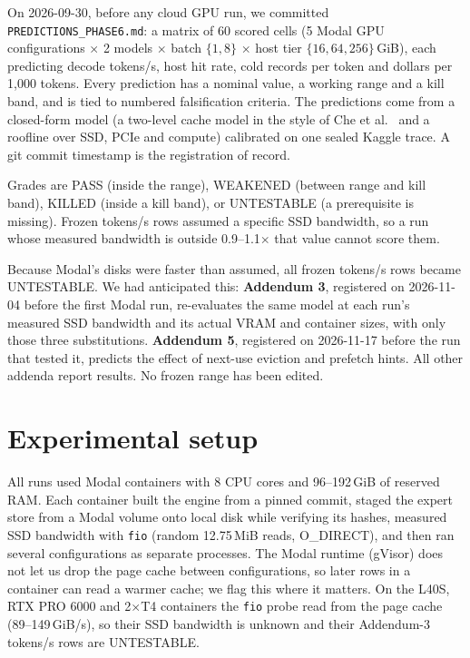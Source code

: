 \documentclass[11pt]{article}
\begin{document}
On 2026-09-30, before any cloud GPU run, we committed
\texttt{PREDICTIONS\_PHASE6.md}: a matrix of 60 scored cells (5 Modal GPU
configurations $\times$ 2 models $\times$ batch $\{1,8\}$ $\times$ host tier
$\{16, 64, 256\}$\,GiB), each predicting decode tokens/s, host hit rate, cold
records per token and dollars per 1,000 tokens. Every prediction has a nominal
value, a working range and a kill band, and is tied to numbered falsification
criteria. The predictions come from a closed-form model (a two-level cache
model in the style of Che et al.\ \citep{che2002hierarchical} and a roofline over
SSD, PCIe and compute) calibrated on one sealed Kaggle trace. A git commit
timestamp is the registration of record.

Grades are PASS (inside the range), WEAKENED (between range and kill band),
KILLED (inside a kill band), or UNTESTABLE (a prerequisite is missing). Frozen
tokens/s rows assumed a specific SSD bandwidth, so a run whose measured
bandwidth is outside 0.9--1.1$\times$ that value cannot score them.

Because Modal's disks were faster than assumed, all frozen tokens/s rows became
UNTESTABLE. We had anticipated this: \textbf{Addendum 3}, registered on
2026-11-04 before the first Modal run, re-evaluates the same model at each run's
measured SSD bandwidth and its actual VRAM and container sizes, with only those
three substitutions. \textbf{Addendum 5}, registered on 2026-11-17 before the
run that tested it, predicts the effect of next-use eviction and prefetch hints.
All other addenda report results. No frozen range has been edited.

\section{Experimental setup}

All runs used Modal containers with 8 CPU cores and 96--192\,GiB of reserved
RAM. Each container built the engine from a pinned commit, staged the expert
store from a Modal volume onto local disk while verifying its hashes, measured
SSD bandwidth with \texttt{fio} (random 12.75\,MiB reads, O\_DIRECT), and then ran
several configurations as separate processes. The Modal runtime (gVisor) does
not let us drop the page cache between configurations, so later rows in a
container can read a warmer cache; we flag this where it matters. On the L40S,
RTX PRO 6000 and 2$\times$T4 containers the \texttt{fio} probe read from the page
cache (89--149\,GiB/s), so their SSD bandwidth is unknown and their Addendum-3
tokens/s rows are UNTESTABLE.
\end{document}

